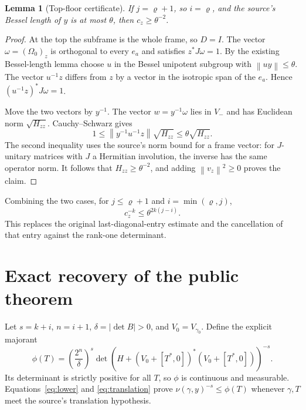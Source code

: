 \documentclass[11pt,letterpaper]{article}
\newtheorem{lemma}[theorem]{Lemma}
\theoremstyle{remark}
\newcommand{\Id}{I}
\newcommand{\norm}[1]{\left\lVert#1\right\rVert}
\newcommand{\abs}[1]{\left|#1\right|}
\begin{document}
\begin{lemma}[Top-floor certificate]\label{lem:top}
If $j=\varrho+1$, so $i=\varrho$, and the source's Bessel length of $y$ is at
most $\theta$, then $c_z\geq\theta^{-2}$.
\end{lemma}

\begin{proof}
At the top the subframe is the whole frame, so $D=\Id$. The vector
$\omega=(\Omega_0)_z$ is orthogonal to every $e_a$ and satisfies $z^*J\omega=1$.
By the existing Bessel-length lemma choose $u$ in the Bessel unipotent subgroup
with $\norm{uy}\leq\theta$. The vector $u^{-1}z$ differs from $z$ by a vector
in the isotropic span of the $e_a$. Hence $(u^{-1}z)^*J\omega=1$.

Move the two vectors by $y^{-1}$. The vector $w=y^{-1}\omega$ lies in $V_-$
and has Euclidean norm $\sqrt{H_{zz}}$. Cauchy--Schwarz gives
\[
 1\leq\norm{y^{-1}u^{-1}z}\sqrt{H_{zz}}
 \leq\theta\sqrt{H_{zz}}.
\]
The second inequality uses the source's norm bound for a frame vector:
for $J$-unitary matrices with $J$ a Hermitian involution, the inverse has the
same operator norm. It follows that $H_{zz}\geq\theta^{-2}$, and adding
$\norm{v_z}^2\geq0$ proves the claim.
\end{proof}

Combining the two cases, for $j\leq\varrho+1$ and $i=\min(\varrho,j)$,
\begin{equation}\label{eq:lastcertificate}
 c_z^{-k}\leq\theta^{2k(j-i)}.
\end{equation}
This replaces the original last-diagonal-entry estimate and the cancellation of
that entry against the rank-one determinant.

\section{Exact recovery of the public theorem}\label{sec:assembly}

Let $s=k+i$, $n=i+1$, $\delta=\abs{\det B}>0$, and
$V_0=V_{\gamma_0}$. Define the explicit majorant
\begin{equation}\label{eq:majorant}
 \phi(T)=\left(\frac{2^n}{\delta}\right)^s
 \det\left(H+(V_0+[T^*,0])^*(V_0+[T^*,0])\right)^{-s}.
\end{equation}
Its determinant is strictly positive for all $T$, so $\phi$ is continuous and
measurable. Equations~\eqref{eq:lower} and \eqref{eq:translation} prove
$\nu(\gamma,y)^{-s}\leq\phi(T)$ whenever $\gamma,T$ meet the source's
translation hypothesis.
\end{document}
